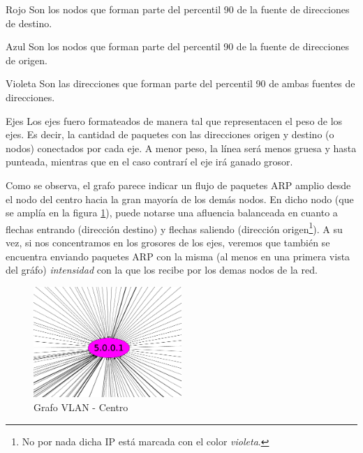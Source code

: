 \begin{LaTeXdescription}
    \item[Rojo] Son los nodos que forman parte del percentil 90 de la fuente de
    direcciones de destino.\\

    \item[Azul] Son los nodos que forman parte del percentil 90 de la fuente de 
    direcciones de origen.\\

    \item[Violeta] Son las direcciones que forman parte del percentil 90 de ambas
    fuentes de direcciones.\\

\item[Ejes] Los ejes fuero formateados de manera tal que representacen el peso de los
    ejes. Es decir, la cantidad de paquetes con las direcciones origen y destino (o nodos)
    conectados por cada eje. A menor peso, la l\'inea ser\'a menos gruesa y hasta
    punteada, mientras que en el caso contrar\'i el eje ir\'a ganado grosor.\\

\end{LaTeXdescription}

\par Como se observa, el grafo parece indicar un flujo de paquetes ARP amplio desde
el nodo del centro hacia la gran mayor\'ia de los dem\'as nodos. En dicho nodo (que se
ampl\'ia en la figura \ref{fig:vlan10_grafo_centro}), puede notarse una afluencia
balanceada en cuanto a flechas entrando (direcci\'on destino) y flechas saliendo
(direcci\'on origen\footnote{No por nada dicha IP est\'a marcada con el color
\textit{violeta}.}). A su vez, si nos concentramos en los grosores de los ejes,
veremos que tambi\'en se encuentra enviando paquetes ARP con la misma (al menos
en una primera vista del gr\'afo) \textit{intensidad} con la que los recibe
por los demas nodos de la red.

\begin{figure}
    \centering
    \includegraphics[width=0.5\textwidth]{img/graph/escenario_1/vlan10/vlan10_500toEnd_centro}
    \caption{Grafo VLAN  - Centro}
    \label{fig:vlan10_grafo_centro}
\end{figure}

